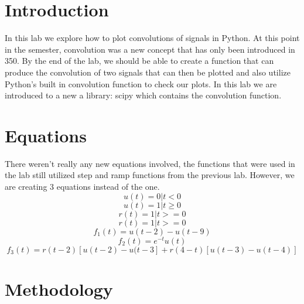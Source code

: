 \documentclass[12pt]{report}
\begin{document}
\section{Introduction}
 

In this lab we explore how to plot convolutions of signals in Python. At this point in the semester, convolution was a new concept that has only been introduced in 350. By the end of the lab, we should be able to create a function that can produce the convolution of two signals that can then be plotted and also utilize Python's built in convolution function to check our plots. In this lab we are introduced to a new a library: scipy which contains the convolution function.  

\section{Equations}

There weren't really any new equations involved, the functions that were used in the lab still utilized step and ramp functions from the previous lab. However, we are creating 3 equations instead of the one. 
\begin{equation*}
u(t) = 0 | t < 0
\end{equation*}
\begin{equation*}
u(t) = 1 | t \geq 0
\end{equation*}
\begin{equation*}
r(t) = 1 | t >= 0
\end{equation*}
\begin{equation*}
r(t) = 1 | t >= 0
\end{equation*}
\begin{equation}
    f_1(t)=  u(t - 2) - u(t - 9)  
\end{equation}
\begin{equation}
    f_2(t)=  e^{-t} u(t)
\end{equation}
\begin{equation}
    f_3(t)=  r(t - 2)[u(t - 2) - u(t - 3] + r(4 - t)[u(t - 3) - u(t - 4)] 
\end{equation}

\section{Methodology}
\end{document}
